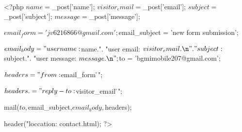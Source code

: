 <?php
$name = $_post['name'];
$visitor_email = $_post['email'];
$subject = $_post['subject'];
$message = $_post['message'];

$email_form ='jv6216866@gmail.com';

$email_subject = 'new form submission';

$email_body = "user name: $name.\n".
              "user email: $visitor_email.\n".
              "subject: $subject.\n".
              "user message: $message .\n";

$to = 'bgmimobile207@gmail.com';

$headers ="from: $email_form \r\n";

$headers .= "reply-to: $visitor_email \r\n";


mail($to,$email_subject,$email_body,$headers);

header("loccation: contact.html);
?>
